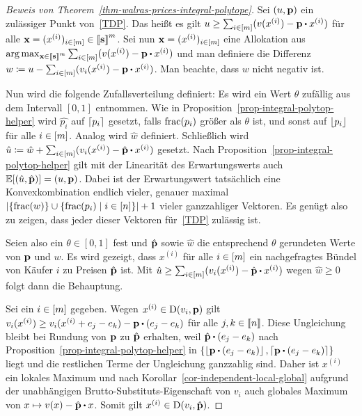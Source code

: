 \begin{proof}[Beweis von Theorem~\ref{thm-walras-prices-integral-polytope}]
	Sei $(u, \mathbf{p})$ ein zulässiger Punkt von~\eqref{TDP}.
	Das heißt es gilt $u \geq \sum_{i\in\first{m}} ( v(x^{(i)}) - \fp \bcdot x^{(i)})$ für alle $\mathbf{x} = (x^{(i)})_{i\in\left[ m \right]}\in\left\llbracket \mathbf{s} \right\rrbracket^m$.
	Sei nun $\mathbf{x} = (x^{(i)})_{i\in\left[ m \right]}$ eine Allokation aus $\arg\max_{\fx\in\ffirst{\fs}^m} \sum_{i\in\first{m}} (v(x^{(i)}) - \fp \bcdot x^{(i)})$ und man definiere die Differenz $w \coloneqq u - \sum_{i\in\first{m}} (v_i(x^{(i)}) - \fp \bcdot x^{(i)})$.
	Man beachte, dass $w$ nicht negativ ist.
	
	Nun wird die folgende Zufallsverteilung definiert:
	Es wird ein Wert $\theta$ zufällig aus dem Intervall $[0,1]$ entnommen.
	Wie in Proposition~\ref{prop-integral-polytop-helper} wird $\hat{p_i}$ auf $\left\lceil p_i \right\rceil$ gesetzt, falls $\operatorname{frac}(p_i)$ größer als $\theta$ ist, und sonst auf $\left\lfloor p_i \right\rfloor$ für alle $i\in\left[ m \right]$.
	Analog wird $\hat{w}$ definiert.
	Schließlich wird $\hat{u}\coloneqq\hat{w}+ \sum_{i\in\first{m}} (v_i(x^{(i)}) - \hat{\fp} \bcdot x^{(i)})$ gesetzt.
	Nach Proposition~\ref{prop-integral-polytop-helper} gilt mit der Linearität des Erwartungswerts auch $\mathbb{E}[(\hat{u},\hat{\mathbf{p}})] = (u, \mathbf{p})$.
	Dabei ist der Erwartungswert tatsächlich eine Konvexkombination endlich vieler, genauer maximal $\left\lvert  \{ \operatorname{frac}(w) \} \cup \{ \operatorname{frac}(p_i) \mid i\in\left[ n \right] \}  \right\rvert + 1$ vieler ganzzahliger Vektoren.
	Es genügt also zu zeigen, dass jeder dieser Vektoren für~\eqref{TDP} zulässig ist.
	
	Seien also ein $\theta\in [0,1]$ fest und $\hat{\mathbf{p}}$ sowie $\hat{w}$ die entsprechend $\theta$ gerundeten Werte von $\mathbf{p}$ und $w$.
	Es wird gezeigt, dass $x^{(i)}$ für alle $i\in\left[ m \right]$ ein nachgefragtes Bündel von Käufer $i$ zu Preisen $\hat{\mathbf{p}}$ ist.
	Mit $\hat{u}\geq \sum_{i\in\first{m}}(v_i(x^{(i)}) - \hat{\fp}\bcdot x^{(i)})$ wegen $\hat{w}\geq0$ folgt dann die Behauptung.
	
	Sei ein $i\in\left[ m \right]$ gegeben. Wegen $x^{(i)}\in\operatorname{D}(v_i, \mathbf{p})$ gilt $v_i(x^{(i)}) \geq v_i(x^{(i)} + e_j - e_k) - \fp \bcdot (e_j - e_k)$ für alle $j,k\in\left\llbracket n \right\rrbracket$.
	Diese Ungleichung bleibt bei Rundung von $\mathbf{p}$ zu $\hat{\mathbf{p}}$ erhalten, weil $\hat{\fp}\bcdot (e_j - e_k)$ nach Proposition~\ref{prop-integral-polytop-helper} in $\{ \floor{\fp\bcdot(e_j - e_k)}, \ceil{\fp\bcdot(e_j - e_k)} \}$ liegt und die rest\-lichen Terme der Ungleichung ganzzahlig sind.
	Daher ist $x^{(i)}$ ein lokales Maximum und nach Korollar~\ref{cor-independent-local-global} aufgrund der unabhängigen Brutto-Substituts-Eigenschaft von $v_i$ auch globales Maximum von $x\mapsto v(x) - \hat{\fp} \bcdot x$.
	Somit gilt $x^{(i)}\in\operatorname{D}(v_i, \hat{\mathbf{p}})$.
\end{proof}
